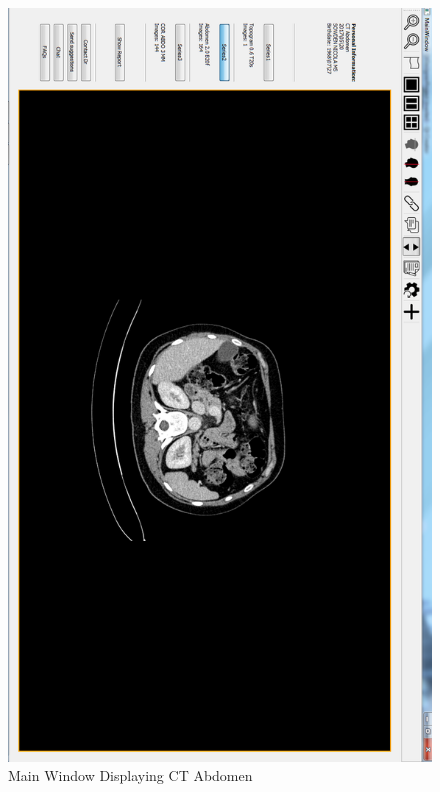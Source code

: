 \begin{figure}[ht]
\centering
\includegraphics[width = 0.80\hsize]{./figures/screenshot/FirstPage}
\caption{Main Window Displaying CT Abdomen}
\end{figure}